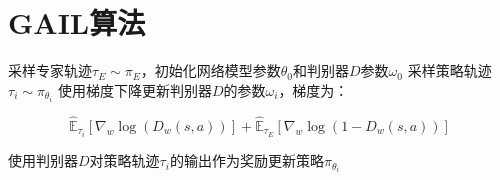 \documentclass[11pt]{ctexart}
\begin{document}
\clearpage
\clearpage

\section{GAIL算法}
\begin{algorithm}[H] %
	\renewcommand{\thealgorithm}{} %
	\caption{} 
	\begin{algorithmic}[1] %
		\STATE 采样专家轨迹$\tau _{E} \sim \pi _{E}$，初始化网络模型参数$\theta _{0}$和判别器$D$参数$\omega _{0}$
			\STATE 采样策略轨迹$\tau_{i} \sim \pi _{\theta _{i}}$
			\STATE 使用梯度下降更新判别器$D$的参数$\omega _{i}$，梯度为：
			\begin{center}
				\begin{equation}
				\hat{\mathbb{E}}_{\tau_{i}}\left[\nabla_{w} \log \left(D_{w}(s, a)\right)\right]+\hat{\mathbb{E}}_{\tau_{E}}\left[\nabla_{w} \log \left(1-D_{w}(s, a)\right)\right]
				\end{equation}
			\end{center}
			\STATE 使用判别器$D$对策略轨迹$\tau_{i}$的输出作为奖励更新策略$\pi _{\theta _{i}}$\footnotemark[2]
		\ENDFOR
	\end{algorithmic}
\end{algorithm}
\clearpage
\end{document}
